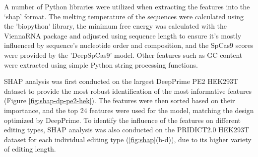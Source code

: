 A number of Python libraries were utilized when extracting the features into the `shap' format. The melting temperature of the sequences were calculated using the 'biopython' library\cite{cockBiopythonFreelyAvailable2009}, the minimum free energy was calculated with the ViennaRNA package and adjusted using sequence length to ensure it's mostly influenced by sequence's nucleotide order and composition\cite{lorenzViennaRNAPackage2011,trottaNormalizationMinimumFree2014}, and the SpCas9 scores were provided by the 'DeepSpCas9' model\cite{kimSpCas9ActivityPrediction2019}. Other features such as GC content were extracted using simple Python string processing functions.

SHAP analysis was first conducted on the largest DeepPrime PE2 HEK293T dataset to provide the most robust identification of the most informative features (Figure \ref{fig:shap-dp-pe2-hek}). The features were then sorted based on their importance, and the top 24 features were used for the model, matching the design optimized by DeepPrime\cite{yuPredictionEfficienciesDiverse2023}. To identify the influence of the features on different editing types, SHAP analysis was also conducted on the PRIDICT2.0 HEK293T dataset for each individual editing type (\autoref{fig:shap}(b-d)), due to its higher variety of editing length. 

